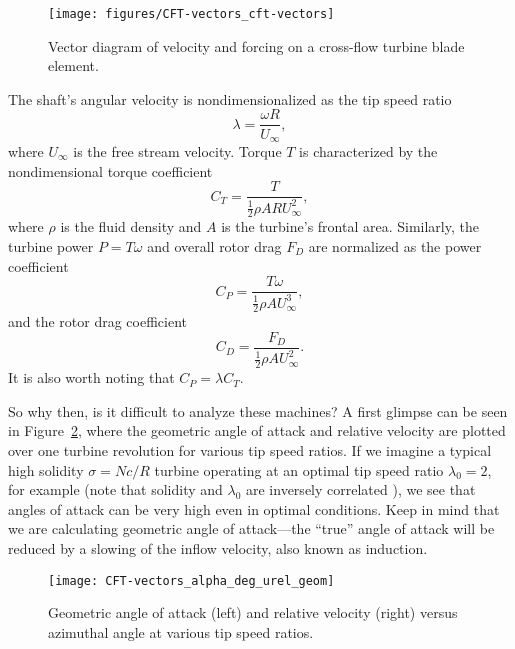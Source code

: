 \begin{figure}
    \centering
    
    \texttt{[image: figures/CFT-vectors\_cft-vectors]}
    
    \caption{Vector diagram of velocity and forcing on a cross-flow turbine
        blade element.}
    
    \label{fig:vectors}
\end{figure}

The shaft's angular velocity is nondimensionalized as the tip speed ratio
\begin{equation}
    \lambda = \frac{\omega R}{U_\infty},
    \label{eq:lambda}
\end{equation}
where $U_\infty$ is the free stream velocity.
Torque $T$ is characterized by the nondimensional torque coefficient 
\begin{equation}
    C_T = \frac{T}{\frac{1}{2} \rho A R U_\infty^2},
    \label{eq:ct}
\end{equation}
where $\rho$ is the fluid density and $A$ is the turbine's frontal area.
Similarly, the turbine power $P = T\omega$ and overall rotor drag $F_D$ are
normalized as the power coefficient
\begin{equation}
    C_P = \frac{T \omega}{\frac{1}{2} \rho A U_\infty^3},
    \label{eq:cp}
\end{equation}
and the rotor drag coefficient
\begin{equation}
    C_D = \frac{F_D}{\frac{1}{2} \rho A U_\infty^2}.
    \label{eq:cd}
\end{equation}
It is also worth noting that $C_P = \lambda C_T$.

So why then, is it difficult to analyze these machines? A first glimpse can be
seen in Figure~\ref{fig:geom-alpha-urel}, where the geometric angle of attack
and relative velocity are plotted over one turbine revolution for various tip
speed ratios. If we imagine a typical high solidity $\sigma = Nc/R$ turbine
operating at an optimal tip speed ratio $\lambda_0 = 2$, for example
\cite{Howell2010} (note that solidity and $\lambda_0$ are inversely correlated
\cite{Templin1974}), we see that angles of attack can be very high even in
optimal conditions. Keep in mind that we are calculating geometric angle of
attack---the ``true'' angle of attack will be reduced by a slowing of the inflow
velocity, also known as induction.

\begin{figure}
    \centering
    
    \texttt{[image: CFT-vectors\_alpha\_deg\_urel\_geom]}
    
    \caption{Geometric angle of attack (left) and relative velocity (right)
        versus azimuthal angle at various tip speed ratios.}
    
    \label{fig:geom-alpha-urel}
\end{figure}

